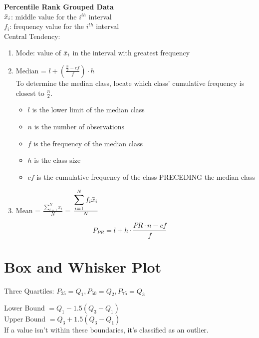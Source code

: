 \documentclass{article}
\begin{document}
\noindent
\textbf{Percentile Rank Grouped Data}\\
\(\Bar{x}_i\): middle value for the \(i^{th}\) interval\\
\(f_i\): frequency value for the \(i^{th}\) interval\\
Central Tendency:
\begin{enumerate}
    \item Mode: value of \(\Bar{x}_i\) in the interval with greatest frequency
    \item Median = \(l + (\frac{\frac{n}{2}-cf}{f}) \cdot h\)\\
    To determine the median class, locate which class' cumulative frequency is closest to \(\frac{n}{2}\).
    \begin{itemize}
        \item \(l\) is the lower limit of the median class
        \item \(n\) is the number of observations
        \item \(f\) is the frequency of the median class
        \item \(h\) is the class size
        \item \(cf\) is the cumulative frequency of the class PRECEDING the median class
    \end{itemize}
    \item Mean = \(\frac{\displaystyle \sum_{i=1}^N x_i}{N}\) = \(\frac{\displaystyle \sum_{i=1}^N f_i\Bar{x}_i}{N}\)
\end{enumerate}
\[P_{PR} = l + h \cdot \frac{PR \cdot n - cf}{f}\]
\section{Box and Whisker Plot}
Three Quartiles: \(P_{25} = Q_1, P_{50} = Q_2, P_{75} = Q_3\)\\

\begin{center}
\end{center}
Lower Bound \(= Q_1 - 1.5(Q_3 - Q_1)\)\\
Upper Bound \(= Q_3 + 1.5(Q_3 - Q_1)\)\\
If a value isn't within these boundaries, it's classified as an outlier.
\newpage
\end{document}
